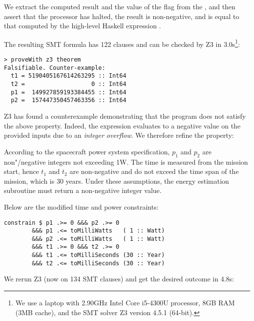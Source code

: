 \noindent
We extract the computed result and the value of the flag  from the
, and then assert that the processor has halted, the result is
non-negative, and is equal to that computed by the high-level Haskell expression
.

The resulting SMT formula has 122 clauses and can be checked by Z3 in
3.0s\footnote{We use a laptop with 2.90GHz Intel Core i5-4300U processor, 8GB
RAM (3MB cache), and the SMT solver Z3 version 4.5.1 (64-bit).}:

\begin{verbatim}
> proveWith z3 theorem
Falsifiable. Counter-example:
  t1 = 5190405167614263295 :: Int64
  t2 =                   0 :: Int64
  p1 =  149927859193384455 :: Int64
  p2 =  157447350457463356 :: Int64
\end{verbatim}

\noindent
Z3 has found a counterexample demonstrating that the program does not
satisfy the above property. Indeed, the expression evaluates to a negative
value on the provided inputs due to an \emph{integer overflow}. We therefore
refine the property:

\begin{tcolorbox}
According to the spacecraft power system specification, $p_1$ and $p_2$ are
non"/negative integers not exceeding 1W. The time is measured
from the mission start, hence $t_1$ and $t_2$ are non-negative and do not exceed
the time span of the mission, which is 30 years. Under these assumptions,
the energy estimation subroutine must return a non-negative integer value.
\end{tcolorbox}

\noindent
Below are the modified time and power constraints:

\begin{verbatim}
constrain $ p1 .>= 0 &&& p2 .>= 0
        &&& p1 .<= toMilliWatts   ( 1 :: Watt)
        &&& p2 .<= toMilliWatts   ( 1 :: Watt)
        &&& t1 .>= 0 &&& t2 .>= 0
        &&& t1 .<= toMilliSeconds (30 :: Year)
        &&& t2 .<= toMilliSeconds (30 :: Year)
\end{verbatim}

\noindent
We rerun Z3 (now on 134 SMT clauses) and get the desired outcome in 4.8s:

